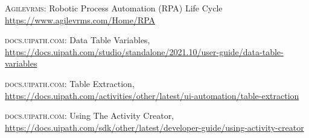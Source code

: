 \documentclass[
]{thesis-ekf}
\theoremstyle{definition}
\theoremstyle{remark}
\begin{document}
\begin{thebibliography}{2}
\textsc{Agilevrms}: Robotic Process Automation (RPA) Life Cycle
\url{https://www.agilevrms.com/Home/RPA}



\textsc{docs.uipath.com}: Data Table Variables, 
\url{https://docs.uipath.com/studio/standalone/2021.10/user-guide/data-table-variables}

\textsc{docs.uipath.com}: Table Extraction, 
\url{https://docs.uipath.com/activities/other/latest/ui-automation/table-extraction}

\textsc{docs.uipath.com}: Using The Activity Creator, 
\url{https://docs.uipath.com/sdk/other/latest/developer-guide/using-activity-creator}


\end{thebibliography}


\end{document}

